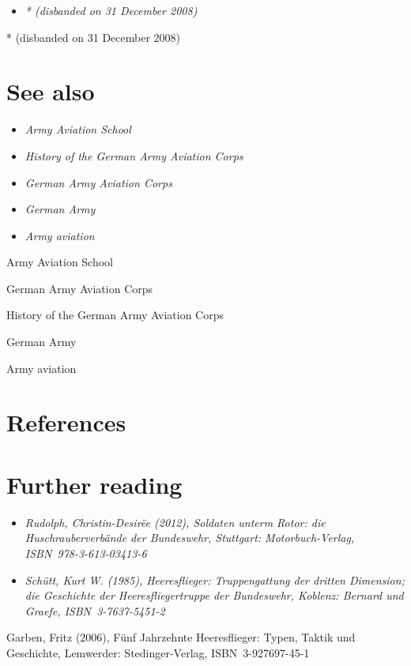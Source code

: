\begin{itemize}
\item
  \emph{* (disbanded on 31 December 2008)}
\end{itemize}

* (disbanded on 31 December 2008)

\section{See also}\label{see-also}

\begin{itemize}
\item
  \emph{Army Aviation School}
\item
  \emph{History of the German Army Aviation Corps}
\item
  \emph{German Army Aviation Corps}
\item
  \emph{German Army}
\item
  \emph{Army aviation}
\end{itemize}

Army Aviation School

German Army Aviation Corps

History of the German Army Aviation Corps

German Army

Army aviation

\section{References}\label{references}

\section{Further reading}\label{further-reading}

\begin{itemize}
\item
  \emph{Rudolph, Christin-Desirëe (2012), Soldaten unterm Rotor: die
  Huschrauberverbände der Bundeswehr, Stuttgart: Motorbuch-Verlag,
  ISBN~978-3-613-03413-6}
\item
  \emph{Schütt, Kurt W. (1985), Heeresflieger: Truppengattung der
  dritten Dimension; die Geschichte der Heeresfliegertruppe der
  Bundeswehr, Koblenz: Bernard und Graefe, ISBN~3-7637-5451-2}
\end{itemize}

Garben, Fritz (2006), Fünf Jahrzehnte Heeresflieger: Typen, Taktik und
Geschichte, Lemwerder: Stedinger-Verlag, ISBN~3-927697-45-1

